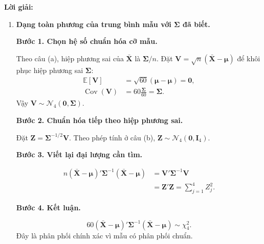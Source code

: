 \documentclass[11pt,a4paper]{article}
\renewcommand{\boldsymbol}[1]{\symbf{#1}}
\newenvironment{solution}{%
  \par\medskip\noindent\textbf{Lời giải:}\par\nopagebreak[4]\smallskip\noindent\ignorespaces
}{\par}
\newcommand{\answer}[1]{\boxed{#1}}
\newcommand{\step}[2]{\par\medskip\noindent\textbf{Bước #1. #2}\par\nopagebreak[4]\smallskip\noindent}
\begin{document}
\begin{solution}
\begin{enumerate}[label=\textbf{\alph*)}]
\begin{align*}
(\boldsymbol{\Sigma}^{-1/2})'\\
&=\boldsymbol{\Sigma}^{-1/2}\boldsymbol{\Sigma}
\boldsymbol{\Sigma}^{-1/2}=\mathbf{I}_4.
\end{align*}
Suy ra $\mathbf{Z}\sim\mathcal{N}_4(\mathbf{0},\mathbf{I}_4)$;
bốn thành phần độc lập và đều có phân phối $\mathcal{N}(0,1)$.
\step{3}{Chuyển dạng toàn phương thành tổng bình phương.}
Dùng $\boldsymbol{\Sigma}^{-1}=
(\boldsymbol{\Sigma}^{-1/2})'\boldsymbol{\Sigma}^{-1/2}$:
\begin{align*}
\mathbf{U}'\boldsymbol{\Sigma}^{-1}\mathbf{U}
&=(\boldsymbol{\Sigma}^{-1/2}\mathbf{U})'
 (\boldsymbol{\Sigma}^{-1/2}\mathbf{U})\\
&=\mathbf{Z}'\mathbf{Z}=Z_1^2+Z_2^2+Z_3^2+Z_4^2.
\end{align*}
\step{4}{Kết luận theo định nghĩa phân phối chi-bình phương.}
Tổng bình phương của $p$ biến chuẩn tắc độc lập có phân phối $\chi_p^2$.
Thay $p=4$:
\[
(\mathbf{X}_1-\boldsymbol{\mu})'\boldsymbol{\Sigma}^{-1}
(\mathbf{X}_1-\boldsymbol{\mu})\sim\answer{\chi_4^2}.
\]
\item \textbf{Dạng toàn phương của trung bình mẫu với $\boldsymbol{\Sigma}$ đã biết.}\par\nopagebreak[4]
\step{1}{Chọn hệ số chuẩn hóa cỡ mẫu.}
Theo câu (a), hiệp phương sai của $\bar{\mathbf{X}}$ là $\boldsymbol{\Sigma}/n$.
Đặt $\mathbf{V}=\sqrt{n}(\bar{\mathbf{X}}-\boldsymbol{\mu})$ để khôi phục
hiệp phương sai $\boldsymbol{\Sigma}$:
\begin{align*}
\mathbb{E}[\mathbf{V}]&=\sqrt{60}(\boldsymbol{\mu}-\boldsymbol{\mu})=\mathbf{0},\\
\operatorname{Cov}(\mathbf{V})&=60\frac{\boldsymbol{\Sigma}}{60}
=\boldsymbol{\Sigma}.
\end{align*}
Vậy $\mathbf{V}\sim\mathcal{N}_4(\mathbf{0},\boldsymbol{\Sigma})$.
\step{2}{Chuẩn hóa tiếp theo hiệp phương sai.}
Đặt $\mathbf{Z}=\boldsymbol{\Sigma}^{-1/2}\mathbf{V}$.
Theo phép tính ở câu (b), $\mathbf{Z}\sim\mathcal{N}_4(\mathbf{0},\mathbf{I}_4)$.
\step{3}{Viết lại đại lượng cần tìm.}
\begin{align*}
n(\bar{\mathbf{X}}-\boldsymbol{\mu})'\boldsymbol{\Sigma}^{-1}
(\bar{\mathbf{X}}-\boldsymbol{\mu})
&=\mathbf{V}'\boldsymbol{\Sigma}^{-1}\mathbf{V}\\
&=\mathbf{Z}'\mathbf{Z}=\sum_{j=1}^4 Z_j^2.
\end{align*}
\step{4}{Kết luận.}
\[
60(\bar{\mathbf{X}}-\boldsymbol{\mu})'\boldsymbol{\Sigma}^{-1}
(\bar{\mathbf{X}}-\boldsymbol{\mu})\sim\answer{\chi_4^2}.
\]
Đây là phân phối chính xác vì mẫu có phân phối chuẩn.

\end{enumerate}
\end{solution}
\end{document}

